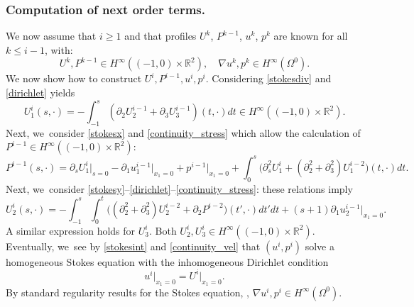 \documentclass[10pt,a4paper]{amsart}
\theoremstyle{plain}
\theoremstyle{definition}
\let\pa\partial
\let\na\nabla
\newcommand{\R}{\mathbb{R}}
\begin{document}
\subsubsection*{Computation of next order terms.} We now assume that $i \ge 1$ and that profiles $U^k$, $P^{k-1}$, $u^k$, $p^k$ are known for all $k \le i-1$, with:
\[
U^k, P^{k-1} \in H^\infty((-1,0) \times \R^2), \quad \na u^k, p^k \in H^\infty(\Omega^0).
\]
We now show how to construct $U^i,P^{i-1}, u^i, p^i$. Considering \eqref{stokesdiv} and \eqref{dirichlet} yields
\[
U^i_1(s,\cdot) = - \int_{-1}^s (\pa_2 U^{i-1}_2 + \pa_3 U^{i-1}_3)(t,\cdot) dt \in H^\infty((-1,0) \times \R^2).
\]
Next, we~consider \eqref{stokesx} and \eqref{continuity_stress} which allow the calculation of \hbox{$P^{i-1} \!\!\in\! H^\infty(\!({-}1,0)\!\times\! \R^2)$}:
\[
P^{i-1}(s,\cdot) = \pa_s U^i_1\vert_{s=0} - \pa_1 u^{i-1}_1\vert_{x_1=0} + p^{i-1}\vert_{x_1=0}
+ \int_0^s \big(\pa^2_s U^i_1 + (\pa^2_2 + \pa^2_3) U^{i-2}_1 \big)(t,\cdot) dt.
\]
Next, we~consider \eqref{stokesy}--\eqref{dirichlet}--\eqref{continuity_stress}: these relations imply
\[
U^i_2(s,\cdot) = - \int_{-1}^s \int_{0}^t \Big((\pa^2_2 + \pa^2_3) U^{i-2}_2 + \pa_2 P^{i-2} \Big)(t',\cdot) dt' dt + (s+1) \pa_1 u^{i-1}_2\vert_{x_1=0}.
\]
A similar expression holds for $U^i_3$. Both $U^i_2, U^i_3 \in H^\infty((-1,0) \times \R^2)$. Eventually, we~see by \eqref{stokesint} and \eqref{continuity_vel} that $(u^i,p^i)$ solve a homogeneous Stokes equation with the inhomogeneous Dirichlet condition
\[
u^i\vert_{x_1=0} = U^i\vert_{x_1=0}.
\]
By standard regularity results for the Stokes equation, \cf
\cite[Th.\,IV.3.2 \& IV.3.3]{Galdi}, $\na u^i, p^i \in H^\infty(\Omega^0)$.
\end{document}
